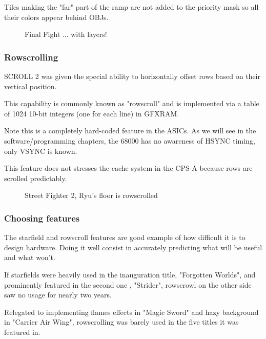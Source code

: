 Tiles making the "far" part of the ramp are not added to the priority mask so all their colors appear behind OBJs.

\vfill
\begin{figure}[!b]
 \caption*{Final Fight ... with layers!}%
 \end{figure}%
\pagebreak

\subsubsection{Rowscrolling}
SCROLL 2 was given the special ability to horizontally offset rows based on their vertical position. 

This capability is commonly known as "rowscroll" and is implemented via a table of 1024 10-bit integers (one for each line) in GFXRAM.

Note this is a completely hard-coded feature in the ASICs. As we will see in the software/programming chapters, the 68000 has no awareness of HSYNC timing, only VSYNC is known.

\begin{trivia}

This feature does not stresses the cache system in the CPS-A because rows are scrolled predictably.

\end{trivia}

\vfill
\begin{figure}[!b]
 \caption*{Street Fighter 2, Ryu's floor is rowscrolled}%
 \end{figure}%
\pagebreak

\subsubsection{Choosing features}

The starfield and rowscroll features are good example of how difficult it is to design hardware. Doing it well consist in accurately predicting what will be useful and what won't. 

If starfields were heavily used in the inauguration title, "Forgotten Worlds", and prominently featured in the second one , "Strider", rowscrowl on the other side saw no usage for nearly two years. 

Relegated to implementing flames effects in "Magic Sword" and hazy background in "Carrier Air Wing", rowscrolling was barely used in the five titles\cite{mame_cps1_video} it was featured in.

